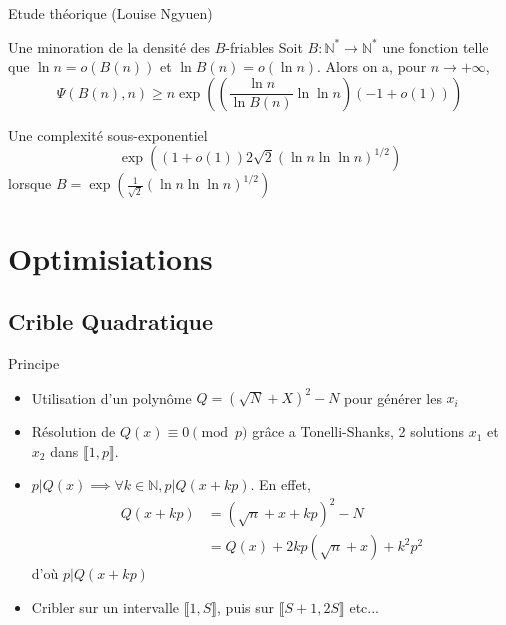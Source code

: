 \documentclass{beamer}
\begin{document}
\begin{frame}{Etude théorique (Louise Ngyuen)}
    \begin{block}{Une minoration de la densité des $B$-friables}
    Soit $B : \mathbb N^\ast \to \mathbb N^\ast$ une fonction telle que $\ln n = o(B(n))$ et $\ln B(n) = o (\ln n)$. Alors on a, pour $n \to +\infty$,
    \[
    \Psi(B(n), n) \ge n\exp\left(\left(\frac {\ln n}{\ln B(n)} \ln \ln n\right)(-1 + o(1))\right)
    \]
    \end{block}
    \begin{block}{Une complexité sous-exponentiel}
    \[
    \exp\left((1+ o(1))2{\sqrt 2} (\ln n \ln \ln n)^{1/2}\right)
    \]
    lorsque $B =\exp\left(\frac 1{\sqrt 2}(\ln n\ln \ln n)^{1/2}\right)$
    \end{block}
\end{frame}

\section{Optimisiations}
\subsection{Crible Quadratique}

\begin{frame}{Principe}
    \begin{itemize}[<+->]
        \item Utilisation d'un polynôme $Q = (\sqrt N + X)^2 - N$ pour générer les $x_i$
        \item Résolution de $Q(x) \equiv 0 \pmod p$ grâce a Tonelli-Shanks, 2 solutions $x_1$ et $x_2$ dans $\llbracket 1, p \rrbracket$.
        \item $p|Q(x) \implies \forall k\in \mathbb N,  p|Q(x+kp)$. En effet, 
        \begin{align*}
            Q(x+kp) &= (\sqrt n + x+kp)^2 - N \\
                    &= Q(x) + 2kp(\sqrt n + x) + k^2p^2
        \end{align*}
        d'où $p|Q(x+kp)$
        \item Cribler sur un intervalle $\llbracket 1,S \rrbracket$, puis sur $\llbracket S+1,2S \rrbracket$ etc...
    \end{itemize}
\end{frame}


\end{document}
